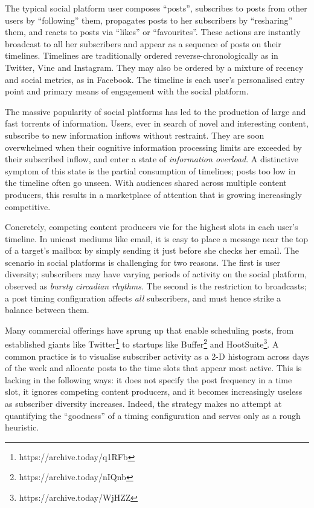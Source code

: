 \documentclass[onesided,letterpaper]{tufte-book}
\begin{document}
The typical social platform user composes ``posts'', subscribes to posts from other users by ``following'' them, propagates posts to her subscribers by ``resharing'' them, and reacts to posts via ``likes'' or ``favourites''. These actions are instantly broadcast to all her subscribers and appear as a sequence of posts on their timelines. Timelines are traditionally ordered reverse-chronologically as in Twitter, Vine and Instagram. They may also be ordered by a mixture of recency and social metrics, as in Facebook. The timeline is each user's personalised entry point and primary means of engagement with the social platform.

The massive popularity of social platforms has led to the production of large and fast torrents of information. Users, ever in search of novel and interesting content, subscribe to new information inflows without restraint\cite{gomez2014quantifying}. They are soon overwhelmed when their cognitive information processing limits are exceeded by their subscribed inflow, and enter a state of \textit{information overload}. A distinctive symptom of this state is the partial consumption of timelines; posts too low in the timeline often go unseen. With audiences shared across multiple content producers, this results in a marketplace of attention that is growing increasingly competitive.

Concretely, competing content producers vie for the highest slots in each user's timeline. In unicast mediums like email, it is easy to place a message near the top of a target's mailbox by simply sending it just before she checks her email. The scenario in social platforms is challenging for two reasons. The first is user diversity; subscribers may have varying periods of activity on the social platform, observed as \textit{bursty circadian rhythms}. The second is the restriction to broadcasts; a post timing configuration affects \textit{all} subscribers, and must hence strike a balance between them.

Many commercial offerings have sprung up that enable scheduling posts, from established giants like Twitter\footnote{https://archive.today/q1RFb} to startups like Buffer\footnote{https://archive.today/nIQnb} and HootSuite\footnote{https://archive.today/WjHZZ}. A common practice is to visualise subscriber activity as a 2-D histogram across days of the week and allocate posts to the time slots that appear most active. This is lacking in the following ways: it does not specify the post frequency in a time slot, it ignores competing content producers, and it becomes increasingly useless as subscriber diversity increases. Indeed, the strategy makes no attempt at quantifying the ``goodness'' of a timing configuration and serves only as a rough heuristic.
\end{document}

